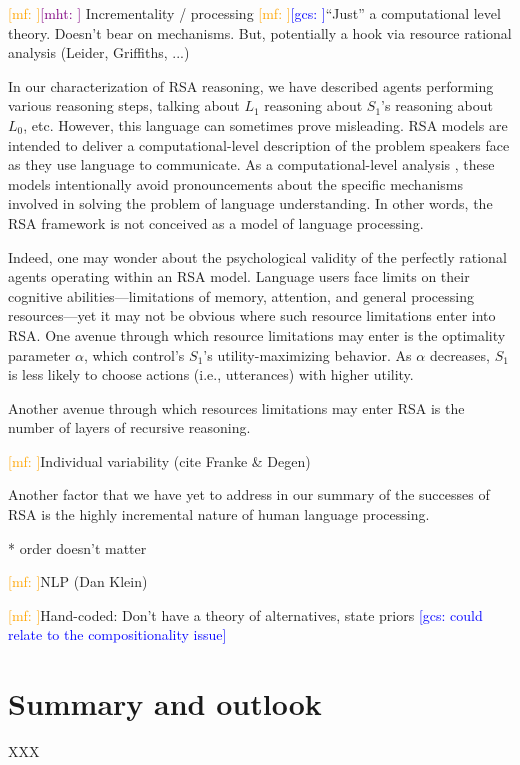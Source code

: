 \documentclass{sp}
\newcommand{\gcs}[1]{\textcolor{blue}{[gcs: #1]}}
\newcommand{\mf}[1]{\textcolor{orange}{[mf: #1]}}
\newcommand{\mht}[1]{\textcolor{purple}{[mht: #1]}}
\begin{document}
\mf{}\mht{} Incrementality / processing
\mf{}\gcs{}``Just'' a computational level theory. Doesn't bear on mechanisms. But, potentially a hook via resource rational analysis (Leider, Griffiths, ...)

In our characterization of RSA reasoning, we have described agents performing various reasoning steps, talking about $L_1$ reasoning about $S_1$'s reasoning about $L_0$, etc. However, this language can sometimes prove misleading. RSA models are intended to deliver a computational-level description of the problem speakers face as they use language to communicate. As a computational-level analysis \citep{marr1982}, these models intentionally avoid pronouncements about the specific mechanisms involved in solving the problem of language understanding. In other words, the RSA framework is not conceived as a model of language processing.

Indeed, one may wonder about the psychological validity of the perfectly rational agents operating within an RSA model. Language users face limits on their cognitive abilities---limitations of memory, attention, and general processing resources---yet it may not be obvious where such resource limitations enter into RSA. One avenue through which resource limitations may enter is the optimality parameter $\alpha$, which control's $S_1$'s utility-maximizing behavior. As $\alpha$ decreases, $S_1$ is less likely to choose actions (i.e., utterances) with higher utility.

Another avenue through which resources limitations may enter RSA is the number of layers of recursive reasoning.

\mf{}Individual variability (cite Franke \& Degen)



Another factor that we have yet to address in our summary of the successes of RSA is the highly incremental nature of human language processing.





* order doesn't matter


\mf{}NLP (Dan Klein)





\mf{}Hand-coded: Don't have a theory of alternatives, state priors \gcs{could relate to the compositionality issue}

\section{Summary and outlook} \label{summary}

XXX




\end{document}
